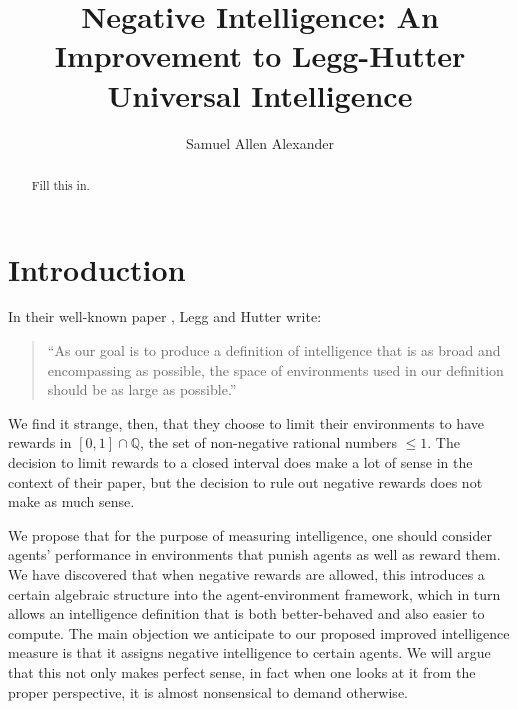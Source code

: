 \documentclass{article}
\title{Negative Intelligence: An Improvement to Legg-Hutter Universal Intelligence}
\author{Samuel Allen Alexander}
\begin{document}
\maketitle

\begin{abstract}
    Fill this in.
\end{abstract}

\section{Introduction}

In their well-known paper \cite{legg}, Legg and Hutter write:
\begin{quote}
    ``As our goal is to produce a definition of intelligence that is as broad and
    encompassing as possible, the space of environments used in our definition should
    be as large as possible.''
\end{quote}
We find it strange, then, that they choose to limit their environments to have
rewards in $[0,1]\cap \mathbb Q$, the set of non-negative rational numbers
$\leq 1$. The decision to limit rewards to a closed interval does make a lot of sense
in the context of their paper, but the decision to rule out negative rewards does
not make as much sense.

We propose that for the purpose of measuring intelligence,
one should consider agents' performance in environments that punish agents as well
as reward them. We have discovered that when negative rewards are allowed, this
introduces a certain algebraic structure into the agent-environment framework, which
in turn allows an intelligence definition that is both better-behaved and also
easier to compute. The main objection we anticipate to our proposed improved
intelligence measure is that it assigns negative intelligence to certain agents.
We will argue that this not only makes perfect sense, in fact when one looks at
it from the proper perspective, it is almost nonsensical to demand otherwise.
\end{document}
